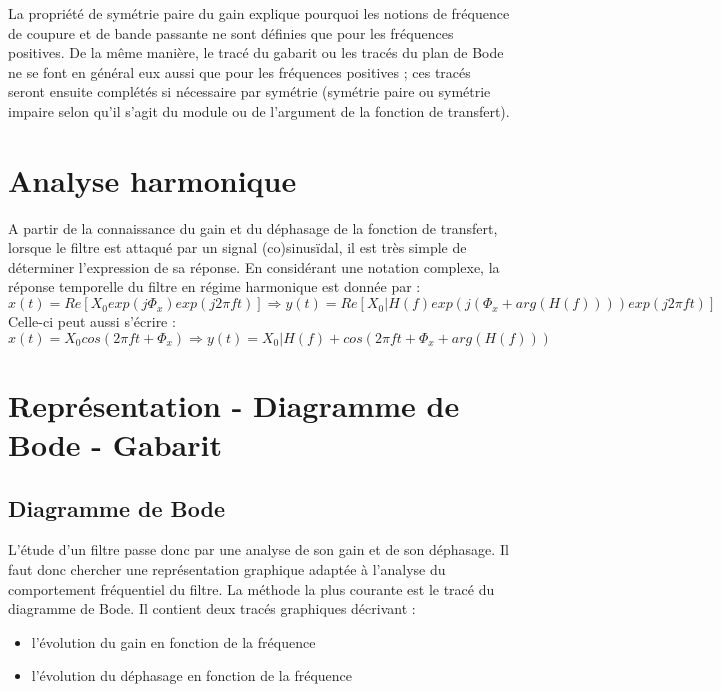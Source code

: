 \documentclass[]{book}
\begin{document}
{	La propriété de symétrie paire du gain explique pourquoi les notions de fréquence de coupure et de bande passante ne sont définies que pour les fréquences positives. De la même manière, le tracé du gabarit ou les tracés du plan de Bode ne se font en général eux aussi que pour les fréquences positives ; ces tracés seront ensuite complétés si nécessaire par symétrie (symétrie paire ou symétrie impaire selon qu’il s’agit du module ou de l’argument de la fonction de transfert).
	
	\section{Analyse harmonique}
	A partir de la connaissance du gain et du déphasage de la fonction de transfert, lorsque le filtre est attaqué par un signal (co)sinusïdal, il est très simple de déterminer l'expression de sa réponse. En considérant une notation complexe, la réponse temporelle du filtre en régime harmonique est donnée par :
	\begin{equation}\label{}
	x(t) = Re[X_{0}exp(j\Phi_{x})exp(j2\pi ft)] \Rightarrow y(t) = Re[X_{0}|H(f)exp(j(\Phi_{x}+arg(H(f))))exp(j2\pi ft)]
	\end{equation}
	Celle-ci peut aussi s'écrire :
	\begin{equation}\label{key}
	x(t) = X_{0}cos(2\pi ft+\Phi_{x}) \Rightarrow y(t) = X_{0}|H(f)+cos(2\pi ft+\Phi_{x}+arg(H(f)))
	\end{equation}
	
	\section{Représentation - Diagramme de Bode - Gabarit}
	\subsection{Diagramme de Bode}
	L'étude d'un filtre passe donc par une analyse de son gain et de son déphasage. Il faut donc chercher une représentation graphique adaptée à l'analyse du comportement fréquentiel du filtre. La méthode la plus courante est le tracé du diagramme de Bode. Il contient deux tracés graphiques décrivant :
	\begin{itemize}
		\item l'évolution du gain en fonction de la fréquence
		\item l'évolution du déphasage en fonction de la fréquence
	\end{itemize}

}
\end{document}
